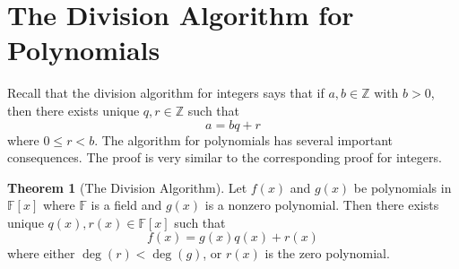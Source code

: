 \documentclass[11pt]{book}
\theoremstyle{definition}\newtheorem{definition}[subsection]{Definition}
\theoremstyle{definition}\newtheorem{example}[subsection]{Example}
\theoremstyle{definition}\newtheorem{notation}[subsection]{Notation}
\theoremstyle{definition}\newtheorem{remark}[subsection]{Remark}
\theoremstyle{theorem}\newtheorem{theorem}[subsection]{Theorem}
\theoremstyle{theorem}\newtheorem{lemma}[subsection]{Lemma}
\theoremstyle{theorem}\newtheorem{proposition}[subsection]{Proposition}
\theoremstyle{theorem}\newtheorem{corollary}[subsection]{Corollary}
\newcommand{\Z}{\mathbb{Z}}
\newcommand{\F}{\mathbb{F}}
\begin{document}
\section{The Division Algorithm for Polynomials}

Recall that the division algorithm for integers says that if $a, b \in \Z$ with $b > 0$, then there exists unique $q, r \in \Z$ such that
\begin{equation*}
    a = bq + r
\end{equation*}
where $0 \leq r < b$. The algorithm for polynomials has several important consequences. The proof is very similar to the corresponding proof for integers.

\begin{theorem}[The Division Algorithm]\label{theorem:2.2.1}
    Let $f(x)$ and $g(x)$ be polynomials in $\F[x]$ where $\F$ is a field and $g(x)$ is a nonzero polynomial. Then there exists unique $q(x), r(x) \in \F[x]$ such that
    \begin{equation*}
        f(x) = g(x)q(x) + r(x)
    \end{equation*}
    where either $\deg(r) < \deg(g)$, or $r(x)$ is the zero polynomial.
\end{theorem}
\end{document}
